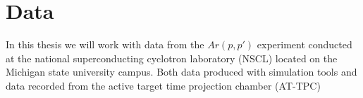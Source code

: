 \section{Data}

In this thesis we will work with data from the $Ar(p, p')$ experiment conducted at the national superconducting cyclotron laboratory (NSCL) located on the Michigan state university campus. Both data produced with simulation tools and data recorded from the active target time projection chamber (AT-TPC) 